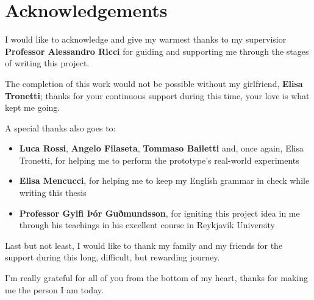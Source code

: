 \chapter*{Acknowledgements}
 I would like to acknowledge and give my warmest thanks to my supervisior \textbf{Professor Alessandro Ricci} for guiding and supporting me through the stages of writing this project.\newline

 \noindent The completion of this work would not be possible without my girlfriend, \textbf{Elisa Tronetti}; thanks for your continuous support during this time, your love is what kept me going.\newline

 \noindent A special thanks also goes to:
 \begin{itemize}
    \item \textbf{Luca Rossi}, \textbf{Angelo Filaseta}, \textbf{Tommaso Bailetti} and, once again, Elisa Tronetti, for helping me to perform the prototype's real-world experiments
    \item \textbf{Elisa Mencucci}, for helping me to keep my English grammar in check while writing this thesis
    \item \textbf{Professor Gylfi Þór Guðmundsson}, for igniting this project idea in me through his teachings in his excellent course in Reykjavík University
 \end{itemize}

 \noindent Last but not least, I would like to thank my family and my friends for the support during this long, difficult, but rewarding journey.\newline
 
 \noindent I'm really grateful for all of you from the bottom of my heart, thanks for making me the person I am today.